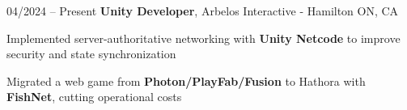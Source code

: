 \begin{twocolentry}{
    04/2024 – Present
}
\fontsize{11 pt}{11 pt}\textbf{Unity Developer}, Arbelos Interactive - Hamilton ON, CA \end{twocolentry}

\vspace{0.10 cm}
\begin{onecolentry}
   \begin{highlights}
        \iftoggle{focusPythonArbelos}{
            \item Upgraded and trained several ML cloth simulation libraries using \textbf{PyTorch}, \textbf{PyTorch3D}, and \textbf{CUDA Toolkit}
            \item Developing a \textbf{TypeScript SDK} with PuerTS for dynamic runtime game scripting and content loading
        }{
            \item Developing a \textbf{TypeScript SDK} with PuerTS for dynamic runtime game scripting and content loading
            \item Upgraded and trained several ML cloth simulation libraries using \textbf{PyTorch}, \textbf{PyTorch3D}, and \textbf{CUDA Toolkit}
        }
       \item Implemented server-authoritative networking with \textbf{Unity Netcode} to improve security and state synchronization
       \item Migrated a web game from \textbf{Photon/PlayFab/Fusion} to Hathora with \textbf{FishNet}, cutting operational costs
   \end{highlights}
\end{onecolentry}
